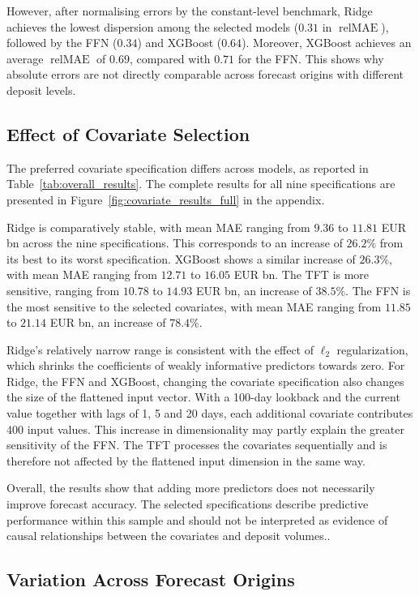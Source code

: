 \documentclass[11pt,a4paper]{article}
\begin{document}
However, after normalising errors by the constant-level benchmark, Ridge
achieves the lowest dispersion among the selected models
($0.31$ in $\operatorname{relMAE}$), followed by the FFN ($0.34$) and 
XGBoost ($0.64$). Moreover, XGBoost achieves an average
$\operatorname{relMAE}$ of $0.69$, compared with $0.71$ for the FFN. This
shows why absolute errors are not directly comparable across forecast origins
with different deposit levels.

\subsection{Effect of Covariate Selection}

The preferred covariate specification differs across models, as reported in
Table~\ref{tab:overall_results}. The complete results for all nine
specifications are presented in
Figure~\ref{fig:covariate_results_full} in the appendix.

Ridge is comparatively stable, with mean MAE ranging from $9.36$ to
$11.81$ EUR bn across the nine specifications. This corresponds to an
increase of $26.2\%$ from its best to its worst specification. XGBoost shows
a similar increase of $26.3\%$, with mean MAE ranging from $12.71$ to
$16.05$ EUR bn. The TFT is more sensitive, ranging from $10.78$ to
$14.93$ EUR bn, an increase of $38.5\%$. The FFN is the most sensitive to
the selected covariates, with mean MAE ranging from $11.85$ to
$21.14$ EUR bn, an increase of $78.4\%$.

Ridge's relatively narrow range is consistent with the effect of
$\ell_2$ regularization, which shrinks the coefficients of weakly informative
predictors towards zero. For Ridge, the FFN and XGBoost, changing the
covariate specification also changes the size of the flattened input vector.
With a 100-day lookback and the current value together with lags of 1, 5 and
20 days, each additional covariate contributes 400 input values. This increase
in dimensionality may partly explain the greater sensitivity of the FFN. The
TFT processes the covariates sequentially and is therefore not affected by
the flattened input dimension in the same way.

Overall, the results show that adding more predictors does not necessarily
improve forecast accuracy. The selected specifications describe predictive
performance within this sample and should not be interpreted as evidence of
causal relationships between the covariates and deposit volumes..

\subsection{Variation Across Forecast Origins}
\end{document}
